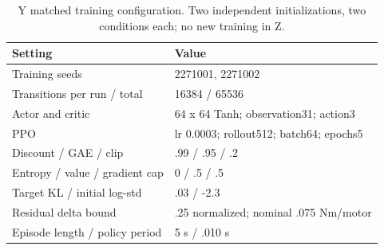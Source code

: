 \begin{table}[t]
\centering\small
\caption{Y matched training configuration. Two independent initializations, two conditions each; no new training in Z.}
\label{tab:ppo}
\begin{tabular}{ll}
\hline
Setting & Value \\
\hline
Training seeds & 2271001, 2271002 \\
Transitions per run / total & 16384 / 65536 \\
Actor and critic & 64 x 64 Tanh; observation31; action3 \\
PPO & lr 0.0003; rollout512; batch64; epochs5 \\
Discount / GAE / clip & .99 / .95 / .2 \\
Entropy / value / gradient cap & 0 / .5 / .5 \\
Target KL / initial log-std & .03 / -2.3 \\
Residual delta bound & .25 normalized; nominal .075 Nm/motor \\
Episode length / policy period & 5 s / .010 s \\
\hline
\end{tabular}
\end{table}
